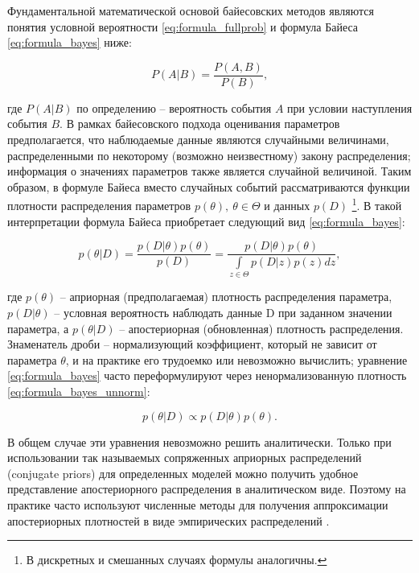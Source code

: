 \documentclass[a4paper,14pt]{extreport}
\begin{document}
Фундаментальной математической основой байесовских методов являются понятия условной вероятности \eqref{eq:formula_fullprob} и формула Байеса \eqref{eq:formula_bayes} ниже:

\begin{equation}
	P(A|B)=\frac{P(A,B)}{P(B)} ,
	\label{eq:formula_fullprob}
\end{equation}

\noindent
где $P(A|B)$ по определению -- вероятность события $A$ при условии наступления события $B$. В рамках байесовского подхода оценивания параметров предполагается, что наблюдаемые данные являются случайными величинами, распределенными по некоторому (возможно неизвестному) закону распределения; информация о значениях параметров также является случайной величиной. Таким образом, в формуле Байеса вместо случайных событий рассматриваются функции плотности распределения параметров $p(\theta), \: \theta \in \Theta$ и данных $p(D)$ \footnote{В дискретных и смешанных случаях формулы аналогичны. }. В такой интерпретации формула Байеса приобретает следующий вид \eqref{eq:formula_bayes}:

\begin{equation}
	p(\theta|D) = \frac{p(D|\theta) p(\theta)}{p(D)} = \frac{p(D|\theta) p(\theta)}{\int\limits_{z\in\Theta}{p(D|z)p(z)dz}} ,
	\label{eq:formula_bayes}
\end{equation}

\noindent
где $p(\theta)$ -- априорная (предполагаемая) плотность распределения параметра, $p(D|\theta)$ -- условная вероятность наблюдать данные D при заданном значении параметра, а $p(\theta|D)$ -- апостериорная (обновленная) плотность распределения. Знаменатель дроби -- нормализующий коэффициент, который не зависит от параметра $\theta$, и на практике его трудоемко или невозможно вычислить; уравнение \eqref{eq:formula_bayes} часто переформулируют через ненормализованную плотность \eqref{eq:formula_bayes_unnorm}:

\begin{equation}
	p(\theta|D) \propto p(D|\theta) p(\theta) .
	\label{eq:formula_bayes_unnorm}
\end{equation}

В общем случае эти уравнения невозможно решить аналитически. Только при использовании так называемых сопряженных априорных распределений (conjugate priors) для определенных моделей можно получить удобное представление апостериорного распределения в аналитическом виде. Поэтому на практике часто используют численные методы для получения аппроксимации апостериорных плотностей в виде эмпирических распределений \cite{intro_to_pp,stan_user_guide}.
\end{document}

